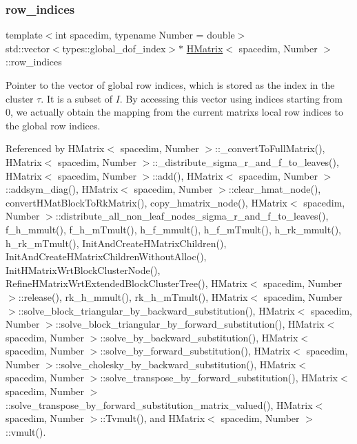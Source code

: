 \mbox{\label{classHMatrix_a33b3a936f1b40e320e96d47471da07ae}} 
\subsubsection{\texorpdfstring{row\+\_\+indices}{row\_indices}}
{\footnotesize\ttfamily template$<$int spacedim, typename Number = double$>$ \\
std\+::vector$<$types\+::global\+\_\+dof\+\_\+index$>$$\ast$ \hyperlink{classHMatrix}{H\+Matrix}$<$ spacedim, Number $>$\+::row\+\_\+indices\hspace{0.3cm}{\ttfamily [private]}}

Pointer to the vector of global row indices, which is stored as the index in the cluster $\tau$. It is a subset of $I$. By accessing this vector using indices starting from 0, we actually obtain the mapping from the current matrix\textquotesingle{}s local row indices to the global row indices. 

Referenced by H\+Matrix$<$ spacedim, Number $>$\+::\+\_\+convert\+To\+Full\+Matrix(), H\+Matrix$<$ spacedim, Number $>$\+::\+\_\+distribute\+\_\+sigma\+\_\+r\+\_\+and\+\_\+f\+\_\+to\+\_\+leaves(), H\+Matrix$<$ spacedim, Number $>$\+::add(), H\+Matrix$<$ spacedim, Number $>$\+::addsym\+\_\+diag(), H\+Matrix$<$ spacedim, Number $>$\+::clear\+\_\+hmat\+\_\+node(), convert\+H\+Mat\+Block\+To\+Rk\+Matrix(), copy\+\_\+hmatrix\+\_\+node(), H\+Matrix$<$ spacedim, Number $>$\+::distribute\+\_\+all\+\_\+non\+\_\+leaf\+\_\+nodes\+\_\+sigma\+\_\+r\+\_\+and\+\_\+f\+\_\+to\+\_\+leaves(), f\+\_\+h\+\_\+mmult(), f\+\_\+h\+\_\+m\+Tmult(), h\+\_\+f\+\_\+mmult(), h\+\_\+f\+\_\+m\+Tmult(), h\+\_\+rk\+\_\+mmult(), h\+\_\+rk\+\_\+m\+Tmult(), Init\+And\+Create\+H\+Matrix\+Children(), Init\+And\+Create\+H\+Matrix\+Children\+Without\+Alloc(), Init\+H\+Matrix\+Wrt\+Block\+Cluster\+Node(), Refine\+H\+Matrix\+Wrt\+Extended\+Block\+Cluster\+Tree(), H\+Matrix$<$ spacedim, Number $>$\+::release(), rk\+\_\+h\+\_\+mmult(), rk\+\_\+h\+\_\+m\+Tmult(), H\+Matrix$<$ spacedim, Number $>$\+::solve\+\_\+block\+\_\+triangular\+\_\+by\+\_\+backward\+\_\+substitution(), H\+Matrix$<$ spacedim, Number $>$\+::solve\+\_\+block\+\_\+triangular\+\_\+by\+\_\+forward\+\_\+substitution(), H\+Matrix$<$ spacedim, Number $>$\+::solve\+\_\+by\+\_\+backward\+\_\+substitution(), H\+Matrix$<$ spacedim, Number $>$\+::solve\+\_\+by\+\_\+forward\+\_\+substitution(), H\+Matrix$<$ spacedim, Number $>$\+::solve\+\_\+cholesky\+\_\+by\+\_\+backward\+\_\+substitution(), H\+Matrix$<$ spacedim, Number $>$\+::solve\+\_\+transpose\+\_\+by\+\_\+forward\+\_\+substitution(), H\+Matrix$<$ spacedim, Number $>$\+::solve\+\_\+transpose\+\_\+by\+\_\+forward\+\_\+substitution\+\_\+matrix\+\_\+valued(), H\+Matrix$<$ spacedim, Number $>$\+::\+Tvmult(), and H\+Matrix$<$ spacedim, Number $>$\+::vmult().

